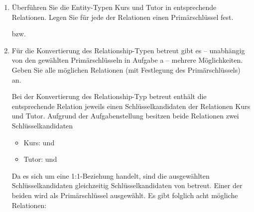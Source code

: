 \documentclass{lehramt-informatik-aufgabe}
\begin{document}
\begin{enumerate}


\item Überführen Sie die Entity-Typen Kurs und Tutor in entsprechende
Relationen. Legen Sie für jede der Relationen einen Primärschlüssel
fest.

\begin{liAntwort}
\begin{liRmodell}

\end{liRmodell}

bzw.

\begin{liRmodell}

\end{liRmodell}
\end{liAntwort}


\item Für die Konvertierung des Relationship-Typen betreut gibt es –
unabhängig von den gewählten Primärschlüsseln in Aufgabe a – mehrere
Möglichkeiten. Geben Sie alle möglichen Relationen (mit Festlegung des
Primärschlüssels) an.

\begin{liAntwort}
Bei der Konvertierung des Relationship-Typ betreut enthält die
ent\-sprech\-ende Relation jeweils einen Schlüsselkandidaten der
Relationen Kurs und Tutor. Aufgrund der Aufgabenstellung besitzen beide
Relationen zwei Schlüsselkandidaten

\begin{itemize}
\item Kurs:  und 
\item Tutor:  und 
\end{itemize}

Da es sich um eine 1:1-Beziehung handelt, sind die ausgewählten
Schlüsselkandidaten gleichzeitig Schlüsselkandidaten von betreut. Einer
der beiden wird als Primärschlüssel ausgewählt. Es gibt folglich acht
mögliche Relationen:

\begin{liRmodell}
\end{liRmodell}
\end{liAntwort}
\end{enumerate}
\end{document}
